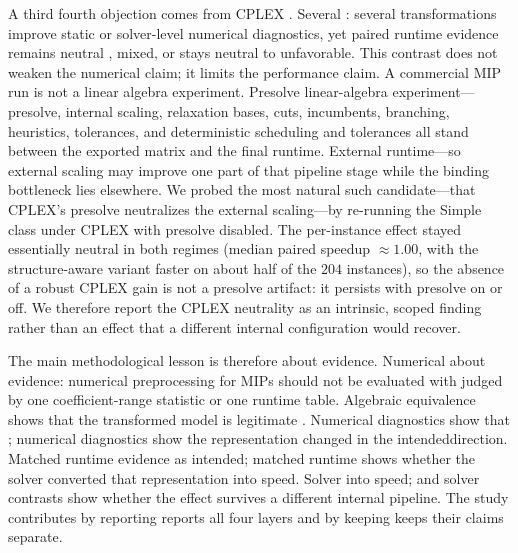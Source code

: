 \documentclass[AMA,Times1COL]{WileyNJDv5} %
\providecommand{\DIFadd}[1]{{\protect\color{blue} \sf #1}} %
\providecommand{\DIFdel}[1]{{\protect\color{red} \scriptsize #1}} %
\providecommand{\DIFaddbegin}{} %
\providecommand{\DIFaddend}{} %
\providecommand{\DIFdelbegin}{} %
\providecommand{\DIFdelend}{} %
\begin{document}
A \DIFdelbegin \DIFdel{third }\DIFdelend \DIFaddbegin \DIFadd{fourth }\DIFaddend objection comes from CPLEX\DIFdelbegin \DIFdel{. Several }\DIFdelend \DIFaddbegin \DIFadd{: several }\DIFaddend transformations improve static or solver-level
\DIFdelbegin \DIFdel{numerical }\DIFdelend diagnostics, yet paired runtime evidence \DIFdelbegin \DIFdel{remains neutral , mixed, or }\DIFdelend \DIFaddbegin \DIFadd{stays neutral to }\DIFaddend unfavorable. This \DIFdelbegin \DIFdel{contrast }\DIFdelend does not weaken the
numerical claim; it limits the performance claim. A commercial MIP run is not a \DIFdelbegin \DIFdel{linear algebra experiment. Presolve}\DIFdelend \DIFaddbegin \DIFadd{linear-algebra
experiment---presolve}\DIFaddend , internal scaling, relaxation bases, cuts, incumbents, branching,
heuristics, \DIFdelbegin \DIFdel{tolerances, and deterministic
scheduling }\DIFdelend \DIFaddbegin \DIFadd{and tolerances }\DIFaddend all stand between the exported matrix and the \DIFdelbegin \DIFdel{final runtime. External }\DIFdelend \DIFaddbegin \DIFadd{runtime---so external
}\DIFaddend scaling may improve one \DIFdelbegin \DIFdel{part of that pipeline }\DIFdelend \DIFaddbegin \DIFadd{stage }\DIFaddend while the binding bottleneck lies elsewhere. \DIFaddbegin \DIFadd{We probed the most
natural such candidate---that CPLEX's presolve neutralizes the external scaling---by re-running the
Simple class under CPLEX with presolve disabled. The per-instance effect stayed essentially neutral
in both regimes (median paired speedup $\approx 1.00$, with the structure-aware variant faster on
about half of the $204$ instances), so the absence of a robust CPLEX gain is not a presolve
artifact: it persists with presolve on or off. We therefore report the CPLEX neutrality as an
intrinsic, scoped finding rather than an effect that a different internal configuration would
recover.
}\DIFaddend 

The \DIFdelbegin \DIFdel{main }\DIFdelend methodological lesson is \DIFdelbegin \DIFdel{therefore about evidence. Numerical }\DIFdelend \DIFaddbegin \DIFadd{about evidence: numerical }\DIFaddend preprocessing for MIPs should not be
\DIFdelbegin \DIFdel{evaluated with }\DIFdelend \DIFaddbegin \DIFadd{judged by }\DIFaddend one coefficient-range statistic or one runtime table. Algebraic equivalence shows \DIFdelbegin \DIFdel{that }\DIFdelend the
transformed model is legitimate\DIFdelbegin \DIFdel{. Numerical
diagnostics show that }\DIFdelend \DIFaddbegin \DIFadd{; numerical diagnostics show }\DIFaddend the representation changed \DIFdelbegin \DIFdel{in the intendeddirection. Matched
runtime evidence }\DIFdelend \DIFaddbegin \DIFadd{as
intended; matched runtime }\DIFaddend shows whether the solver converted that \DIFdelbegin \DIFdel{representation into speed. Solver
}\DIFdelend \DIFaddbegin \DIFadd{into speed; and solver
}\DIFaddend contrasts show whether the effect survives a different internal pipeline. The study \DIFdelbegin \DIFdel{contributes by reporting }\DIFdelend \DIFaddbegin \DIFadd{reports }\DIFaddend all
four layers and \DIFdelbegin \DIFdel{by keeping }\DIFdelend \DIFaddbegin \DIFadd{keeps }\DIFaddend their claims separate.
\end{document}
